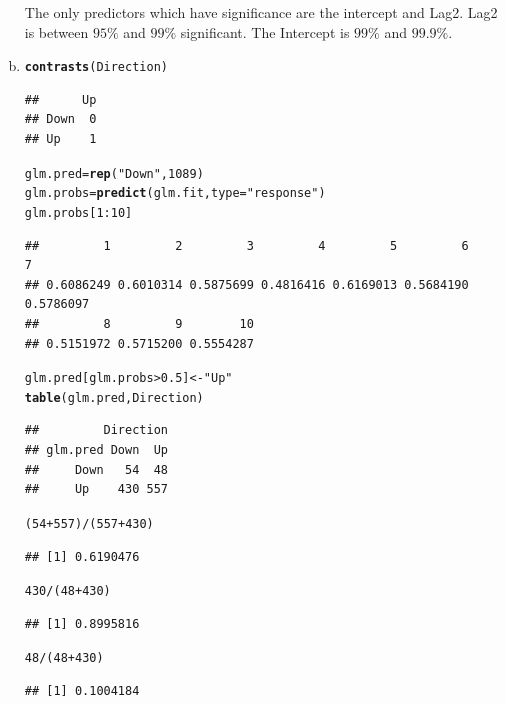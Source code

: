 \documentclass{article}\usepackage[]{graphicx}\usepackage[]{color}
\makeatletter
\newcommand{\hlnum}[1]{\textcolor[rgb]{0.686,0.059,0.569}{#1}}%
\newcommand{\hlstr}[1]{\textcolor[rgb]{0.192,0.494,0.8}{#1}}%
\newcommand{\hlopt}[1]{\textcolor[rgb]{0,0,0}{#1}}%
\newcommand{\hlstd}[1]{\textcolor[rgb]{0.345,0.345,0.345}{#1}}%
\newcommand{\hlkwb}[1]{\textcolor[rgb]{0.69,0.353,0.396}{#1}}%
\newcommand{\hlkwc}[1]{\textcolor[rgb]{0.333,0.667,0.333}{#1}}%
\newcommand{\hlkwd}[1]{\textcolor[rgb]{0.737,0.353,0.396}{\textbf{#1}}}%
\newenvironment{kframe}{%
 \def\at@end@of@kframe{}%
 \ifinner\ifhmode%
  \def\at@end@of@kframe{\end{minipage}}%
  \begin{minipage}{\columnwidth}%
 \fi\fi%
 \def\FrameCommand##1{\hskip\@totalleftmargin \hskip-\fboxsep
 \colorbox{shadecolor}{##1}\hskip-\fboxsep
     \hskip-\linewidth \hskip-\@totalleftmargin \hskip\columnwidth}%
 \MakeFramed {\advance\hsize-\width
   \@totalleftmargin\z@ \linewidth\hsize
   \@setminipage}}%
 {\par\unskip\endMakeFramed%
 \at@end@of@kframe}
\newenvironment{knitrout}{}{} %
\makeatother
\begin{document}
\begin{enumerate}[(a)]
The only predictors which have significance are the intercept and Lag2. Lag2 is between $95\%$ and $99\%$ significant. The Intercept is $99\%$ and $99.9\%$.

\item
\begin{knitrout}
\color{fgcolor}\begin{kframe}
\begin{alltt}
\hlkwd{contrasts}\hlstd{(Direction)}
\end{alltt}
\begin{verbatim}
##      Up
## Down  0
## Up    1
\end{verbatim}
\begin{alltt}
\hlstd{glm.pred}\hlkwb{=}\hlkwd{rep}\hlstd{(}\hlstr{"Down"}\hlstd{,} \hlnum{1089}\hlstd{)}
\hlstd{glm.probs}\hlkwb{=}\hlkwd{predict}\hlstd{(glm.fit,}\hlkwc{type}\hlstd{=}\hlstr{"response"}\hlstd{)}
\hlstd{glm.probs[}\hlnum{1}\hlopt{:}\hlnum{10}\hlstd{]}
\end{alltt}
\begin{verbatim}
##         1         2         3         4         5         6         7 
## 0.6086249 0.6010314 0.5875699 0.4816416 0.6169013 0.5684190 0.5786097 
##         8         9        10 
## 0.5151972 0.5715200 0.5554287
\end{verbatim}
\begin{alltt}
\hlstd{glm.pred[glm.probs}\hlopt{>}\hlnum{0.5}\hlstd{]}\hlkwb{<-}\hlstr{"Up"}
\hlkwd{table}\hlstd{(glm.pred,Direction)}
\end{alltt}
\begin{verbatim}
##         Direction
## glm.pred Down  Up
##     Down   54  48
##     Up    430 557
\end{verbatim}
\begin{alltt}
\hlstd{(}\hlnum{54}\hlopt{+}\hlnum{557}\hlstd{)}\hlopt{/}\hlstd{(}\hlnum{557}\hlopt{+}\hlnum{430}\hlstd{)}
\end{alltt}
\begin{verbatim}
## [1] 0.6190476
\end{verbatim}
\begin{alltt}
\hlnum{430}\hlopt{/}\hlstd{(}\hlnum{48}\hlopt{+}\hlnum{430}\hlstd{)}
\end{alltt}
\begin{verbatim}
## [1] 0.8995816
\end{verbatim}
\begin{alltt}
\hlnum{48}\hlopt{/}\hlstd{(}\hlnum{48}\hlopt{+}\hlnum{430}\hlstd{)}
\end{alltt}
\begin{verbatim}
## [1] 0.1004184
\end{verbatim}
\end{kframe}
\end{knitrout}


\end{enumerate}
\end{document}
